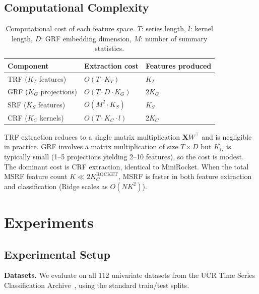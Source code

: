 \documentclass{article}
\begin{document}
\subsection{Computational Complexity}

\begin{table}[h]
  \caption{Computational cost of each feature space. $T$: series length, $l$: kernel length, $D$: GRF embedding dimension, $M$: number of summary statistics.}
  \label{tab:complexity}
  \centering
  \small
  \begin{tabular}{@{}lll@{}}
    \toprule
    Component & Extraction cost & Features produced \\
    \midrule
    TRF ($K_T$ features)    & $O(T \cdot K_T)$          & $K_T$ \\
    GRF ($K_G$ projections) & $O(T \cdot D \cdot K_G)$  & $2 K_G$ \\
    SRF ($K_S$ features)    & $O(M^2 \cdot K_S)$        & $K_S$ \\
    CRF ($K_C$ kernels)     & $O(T \cdot K_C \cdot l)$  & $2 K_C$ \\
    \bottomrule
  \end{tabular}
\end{table}

TRF extraction reduces to a single matrix multiplication $\mathbf{X} W^\top$ and is negligible in practice.
GRF involves a matrix multiplication of size $T \times D$ but $K_G$ is typically small (1--5 projections yielding 2--10 features), so the cost is modest.
The dominant cost is CRF extraction, identical to MiniRocket.
When the total MSRF feature count $K \ll 2 K_C^{\mathrm{ROCKET}}$, MSRF is faster in both feature extraction and classification (Ridge scales as $O(N K^2)$).


\section{Experiments}
\label{sec:experiments}

\subsection{Experimental Setup}

\textbf{Datasets.}
We evaluate on all 112 univariate datasets from the UCR Time Series Classification Archive~\citep{dau2019ucr}, using the standard train/test splits.
\end{document}
